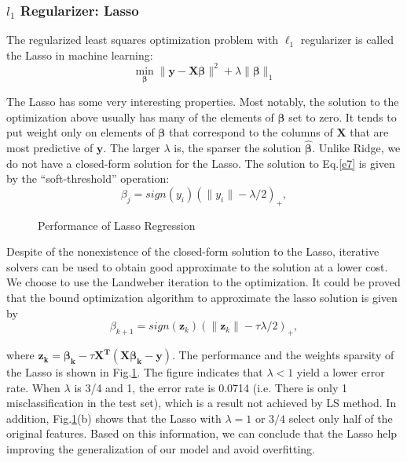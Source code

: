 \documentclass[10pt,letterpaper]{article}
\begin{document}
\subsubsection{$l_1$ Regularizer: Lasso}
The regularized least squares optimization problem with $\ell_1$ regularizer is called the Lasso in machine learning: 
\begin{equation}\label{e7}
\min\limits_{\boldsymbol \beta} \| \boldsymbol{y} - \mathbf{X}\mathbf{\boldsymbol \beta}\|^2 + \lambda \|\mathbf{\boldsymbol \beta}\|_1
\end{equation}

The Lasso has some very interesting properties. Most notably, the solution to the optimization above usually has many of the elements of $\boldsymbol \beta$ set to zero. It tends to put weight only on elements of $\boldsymbol \beta$ that correspond to the columns of $\boldsymbol{X}$ that are most predictive of $\boldsymbol{y}$. The larger $\lambda$ is, the sparser the solution $\hat{\boldsymbol \beta}$. Unlike Ridge, we do not have a closed-form solution for the Lasso. The solution to Eq.\ref{e7} is given by the ``soft-threshold'' operation: 
\begin{equation}\label{e8}
\beta_j = sign(y_i)(\|y_i\| - \lambda/2)_{+},
\end{equation}


\begin{figure}[!ht]
    \centering
    \qquad
    \caption{Performance of Lasso Regression}%
    \label{f5}%
\end{figure}

Despite of the nonexistence of the closed-form solution to the Lasso, iterative solvers can be used to obtain good approximate to the solution at a lower cost. We choose to use the Landweber iteration to the optimization. It could be proved that the bound optimization algorithm to approximate the lasso solution is given by 
\begin{equation}\label{e9}
\beta_{k+1} = sign(\boldsymbol{z}_k)(\|\boldsymbol{z}_k\| - \tau\lambda/2)_{+},
\end{equation}

\noindent where $\boldsymbol{z_k} = \boldsymbol{\beta_k} - \tau \boldsymbol{X^{T}}(\boldsymbol{X\beta_k} - \boldsymbol{y})$. The performance and the weights sparsity of the Lasso is shown in Fig.\ref{f5}. The figure indicates that $\lambda < 1$ yield a lower error rate. When $\lambda$ is 3/4 and 1, the error rate is 0.0714 (i.e. There is only 1 misclassification in the test set), which is a result not achieved by LS method. In addition, Fig.\ref{f5}(b) shows that the Lasso with $\lambda = 1$ or $3/4$ select only half of the original features. Based on this information, we can conclude that the Lasso help improving the generalization of our model and avoid overfitting.
\end{document}
